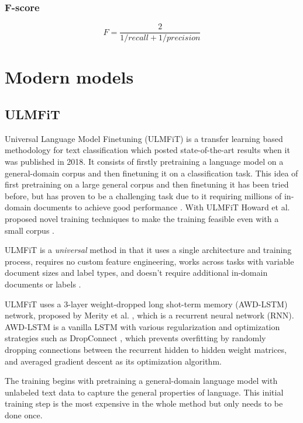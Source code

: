 \subsubsection{F-score} \label{F-score}

\begin{equation}
  F=\dfrac{2}{1/recall + 1/precision}
\end{equation}

\section{Modern models} \label{Modern models}

\subsection{ULMFiT} \label{ULMFiT}
Universal Language Model Finetuning (ULMFiT) is a transfer learning based methodology for text classification which posted state-of-the-art results when it was published in 2018.
It consists of firstly pretraining a language model on a general-domain corpus and then finetuning it on a classification task.
This idea of first pretraining on a large general corpus and then finetuning it has been tried before, but has proven to be a challenging task due to it requiring millions of in-domain documents to achieve good performance \cite{dai2015}.
With ULMFiT Howard et al. proposed novel training techniques to make the training feasible even with a small corpus \cite{howard2018}.

ULMFiT is a \textit{universal} method in that it uses a single architecture and training process, requires no custom feature engineering, works across tasks with variable document sizes and label types, and doesn't require additional in-domain documents or labels \cite{howard2018}.

ULMFiT uses a 3-layer weight-dropped long shot-term memory (AWD-LSTM) network, proposed by Merity et al. \cite{merity2017}, which is a recurrent neural network (RNN).
AWD-LSTM is a vanilla LSTM with various regularization and optimization strategies such as DropConnect \cite{wan}, which prevents overfitting by randomly dropping connections between the recurrent hidden to hidden weight matrices, and averaged gradient descent as its optimization algorithm.

The training begins with pretraining a general-domain language model with unlabeled text data to capture the general properties of language.
This initial training step is the most expensive in the whole method but only needs to be done once.

